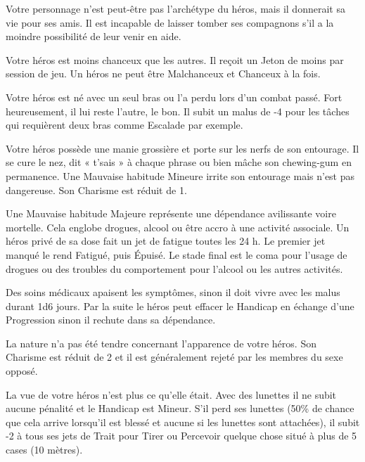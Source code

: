 \begin{description}[align=left]
    \item [Loyal (Mineur)]
        Votre personnage n’est peut-être pas l’archétype du héros, mais il donnerait sa vie pour ses amis. Il est incapable de laisser tomber ses compagnons s’il a la moindre possibilité de leur venir en aide.

    \item [Malchanceux (Majeur)]
        Votre héros est moins chanceux que les autres. Il reçoit un Jeton de moins par session de jeu. Un héros ne peut être Malchanceux et Chanceux à la fois.

    \item [Manchot (Majeur)]
        Votre héros est né avec un seul bras ou l’a perdu lors d’un combat passé. Fort heureusement, il lui reste l’autre, le bon. Il subit un malus de -4 pour les tâches qui requièrent deux bras comme Escalade par exemple.

    \item [Mauvaise habitude (Mineur ou Majeur)]
        Votre héros possède une manie grossière et porte sur les nerfs de son entourage. Il se cure le nez, dit « t’sais » à chaque phrase ou bien mâche son chewing-gum en permanence. Une Mauvaise habitude Mineure irrite son entourage mais n’est pas dangereuse. Son Charisme est réduit de 1.

        Une Mauvaise habitude Majeure représente une dépendance avilissante voire mortelle. Cela englobe drogues, alcool ou être accro à une activité associale. Un héros privé de sa dose fait un jet de fatigue toutes les 24 h. Le premier jet manqué le rend Fatigué, puis Épuisé. Le stade final est le coma pour l’usage de drogues ou des troubles du comportement pour l’alcool ou les autres activités.

        Des soins médicaux apaisent les symptômes, sinon il doit vivre avec les malus durant 1d6 jours. Par la suite le héros peut effacer le Handicap en échange d’une Progression sinon il rechute dans sa dépendance.

    \item [Moche (Mineur)]
        La nature n’a pas été tendre concernant l’apparence de votre héros. Son Charisme est réduit de 2 et il est généralement rejeté par les membres du sexe opposé.

    \item [Myope (Mineur)]
        La vue de votre héros n’est plus ce qu’elle était. Avec des lunettes il ne subit aucune pénalité et le Handicap est Mineur. S’il perd ses lunettes (50\% de chance que cela arrive lorsqu’il est blessé et aucune si les lunettes sont attachées), il subit -2 à tous ses jets de Trait pour Tirer ou Percevoir quelque chose situé à plus de 5 cases (10 mètres).


\end{description}
